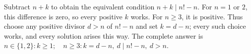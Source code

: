 Subtract $n+k$ to obtain the equivalent condition $n+k\mid n!-n$. For $n=1$ or $2$, this difference is zero, so every positive $k$ works. For $n\ge3$, it is positive. Thus choose any positive divisor $d>n$ of $n!-n$ and set $k=d-n$; every such choice works, and every solution arises this way. The complete answer is $\boxed{n\in\{1,2\}:k\ge1;\quad n\ge3:k=d-n,\ d\mid n!-n,\ d>n}$.
